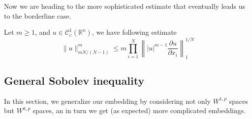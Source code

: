 \documentclass{article}
\begin{document}
Now we are heading to the more sophisticated estimate that eventually leads us to the borderline case.

\begin{Lem}
    Let $m\geq 1$, and $u\in\mathscr{C}^{1}_{c}(\mathbb{R}^n)$, we have following estimate
    $$
    \|u\|_{mN/(N-1)}^{m}\leq m\prod_{i=1}^{N}\left\||u|^{m-1}\frac{\partial u}{\partial x_i}\right\|_{1}^{1/N}
    $$
\end{Lem}

\subsection{General Sobolev inequality}

\indent\indent In this section, we generalize our embedding by considering not only $W^{1, p}$ spaces but $W^{k,p}$ spaces, an in turn we get (as expected) more complicated embeddings. 
\end{document}
